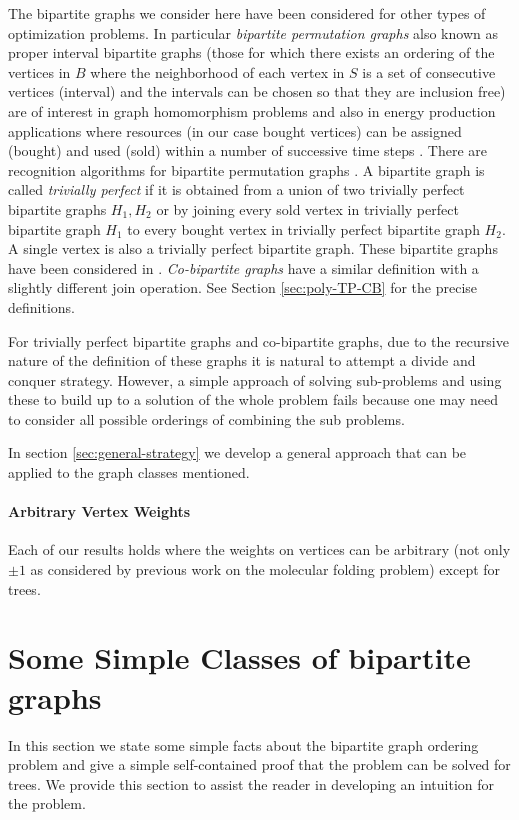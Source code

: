 \documentclass[letterpaper,11pt,abstracton]{scrartcl}
\begin{document}
The bipartite graphs we consider here have been considered for other types of optimization problems.
In particular \emph{bipartite permutation graphs} also known as proper interval bipartite graphs
(those for which there exists an ordering of the vertices in $B$ where the neighborhood of each vertex in $S$ is a set of consecutive vertices (interval) and the intervals can be chosen
so that they are inclusion free) are of interest in graph homomorphism problems \cite{GHRY08} and also
in energy production applications where resources (in our case bought vertices) can be assigned (bought) and used (sold) within a number of
successive time steps \cite{KKRS13,MS12}.
There are recognition algorithms for bipartite permutation graphs \cite{GHRY08,SBS98}.
A bipartite graph is called \emph{trivially perfect} if it is obtained from a union of two trivially perfect bipartite graphs $H_1,H_2$ or by joining every sold vertex in trivially perfect bipartite graph
$H_1$ to every bought vertex in trivially perfect bipartite graph $H_2$. A single vertex is also a trivially perfect bipartite graph.
These bipartite graphs have been considered in \cite{CEM13,EKLT12,MMS04}.  \emph{Co-bipartite graphs} have a similar definition
with a slightly different join operation. See Section \ref{sec:poly-TP-CB} for the precise definitions.

For trivially perfect bipartite graphs and co-bipartite graphs, due to the recursive nature
of the definition of these graphs it is natural to attempt a divide and conquer strategy.
However, a simple approach of solving sub-problems and using these to build up to a solution of the whole
problem fails because one may need to consider all possible orderings of combining the sub problems.

In section \ref{sec:general-strategy} we develop a general approach that can be applied to the graph classes
mentioned.





\paragraph{Arbitrary Vertex Weights}
Each of our results holds where the weights on vertices can be
arbitrary (not only $\pm 1$ as considered by previous work on the
molecular folding problem) except for trees. 

\section{Some Simple Classes of bipartite graphs}\label{sec:simple}
In this section we state some simple facts about the bipartite graph ordering
problem and give a simple self-contained proof that the problem can be
solved for trees.  We provide this section to assist the reader in
developing an intuition for the problem.
\end{document}
